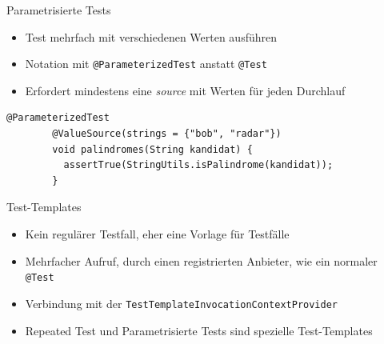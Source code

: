 \documentclass[utf8,t,aspectratio=169]{beamer}
\begin{document}
    \begin{frame}[fragile]{Parametrisierte Tests}
      \begin{itemize}
        \item Test mehrfach mit verschiedenen Werten ausführen
        \item Notation mit \lstinline|@ParameterizedTest| anstatt
          \lstinline|@Test|
        \item Erfordert mindestens eine \textit{source} mit Werten für jeden
          Durchlauf
      \end{itemize}
      \begin{lstlisting}[gobble=8]
        @ParameterizedTest
        @ValueSource(strings = {"bob", "radar"})
        void palindromes(String kandidat) {
          assertTrue(StringUtils.isPalindrome(kandidat));
        }
      \end{lstlisting}
    \end{frame}
    \begin{frame}[fragile]{Test-Templates}
      \begin{itemize}
        \item Kein regulärer Testfall, eher eine Vorlage für Testfälle
        \item Mehrfacher Aufruf, durch einen registrierten Anbieter, wie ein
          normaler \lstinline|@Test|
        \item Verbindung mit der
          \lstinline|TestTemplateInvocationContextProvider|
        \item Repeated Test und Parametrisierte Tests sind spezielle
          Test-Templates
      \end{itemize}
    \end{frame}
\end{document}
